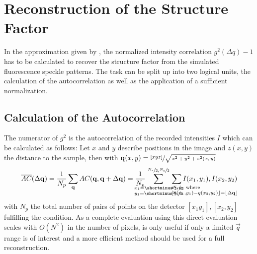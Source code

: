 \section{Reconstruction of the Structure Factor}
In the approximation given by , the normalized intensity correlation $g^2(\Delta q)-1$ has to be calculated to recover the structure factor from the simulated fluorescence speckle patterns. The task can be split up into two logical units, the calculation of the autocorrelation as well as the application of a sufficient normalization.

\subsection{Calculation of the Autocorrelation}
The numerator of $g^2$ is the autocorrelation of the recorded intensities $I$ which can be calculated as follows:
Let $x$ and $y$ describe positions in the image and $z(x,y)$ the distance to the sample, then 
with $\mathbf{q}(x,y) = \sfrac{[x y z]}{\sqrt{x ^ 2 + y ^ 2 + z^2(x,y)}}$
\begin{equation}
\overline{AC}(\Delta \vec{q}) = 
\frac{1}{N_p} \sum_{\vec{q}} AC(\vec{q},\vec{q}+\Delta \vec{q})=
\frac{1}{N_p} \quad \sum^{	\crampedclap{\sfrac{N_x}{2},\sfrac{N_y}{2}}}_{
	\crampedclap{
		\begin{subarray}{l}
		x_1=\shortminus\sfrac{N_x}{2}\\
		y_1=\shortminus\sfrac{N_y}{2}
		\end{subarray}
	}}\quad
\sum_{\crampedclap{\qquad\qquad\qquad\qquad
		\begin{subarray}{l}
			x_2,y_2 \text{ where} \\ \lfloor q(x_1,y_1)-q(x_2,y_2)\rfloor=\lfloor\Delta\vec{q}\rfloor
		\end{subarray}}}
	I(x_1,y_1),I(x_2,y_2)
	\label{eq:correlation}
\end{equation}
with $N_p$ the total number of pairs of points on the detector $[x_1 y_1],[x_2,y_2]$  fulfilling the condition. As a complete evaluation using this direct evaluation scales with $O(N^2)$ in the number of pixels, is only useful if only a limited $\vec{q}$ range is of interest and a more efficient method should be used for a full reconstruction.

